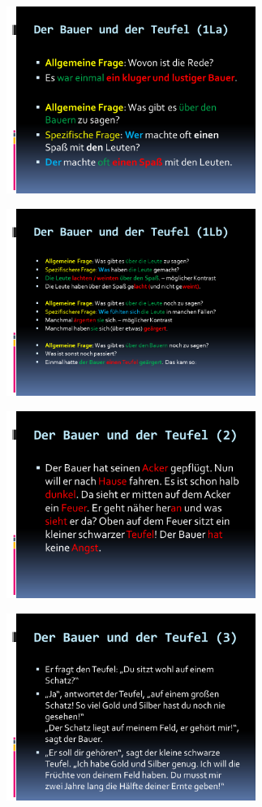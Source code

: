 \documentclass[
  letterpaper,
]{scrbook}
\begin{document}
\includegraphics[width=3.2in,height=\textheight]{./pictures/satzakzentuierung/satzakzent_Diapozitiv10.PNG}

\includegraphics[width=3.2in,height=\textheight]{./pictures/satzakzentuierung/satzakzent_Diapozitiv11.PNG}

\includegraphics[width=3.2in,height=\textheight]{./pictures/satzakzentuierung/satzakzent_Diapozitiv12.PNG}

\includegraphics[width=3.2in,height=\textheight]{./pictures/satzakzentuierung/satzakzent_Diapozitiv13.PNG}
\end{document}
